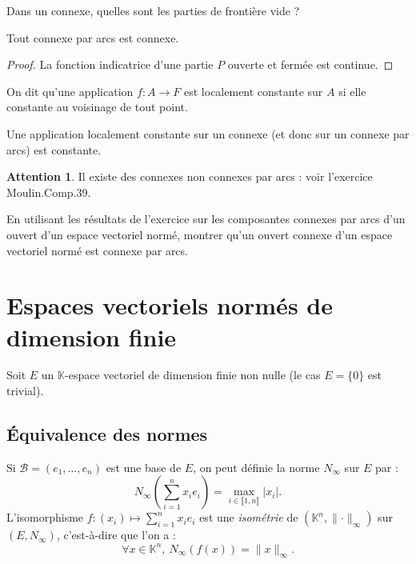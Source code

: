 \documentclass[french]{article}
\newcommand{\K}{\mathbb{K}}
\theoremstyle{plain}
\theoremstyle{definition}
\newtheorem*{attention}{Attention}
\theoremstyle{remark}
\begin{document}
\begin{exo}
	Dans un connexe, quelles sont les parties de frontière vide ?
\end{exo}

\begin{prop}%
	Tout connexe par arcs est connexe.
\end{prop}
\begin{proof}
	La fonction indicatrice d'une partie $P$ ouverte et fermée est continue.
\end{proof}

\begin{dfn}
	On dit qu'une application $f:A\to F$ est localement constante sur $A$ si elle constante au voisinage de tout point.
\end{dfn}

\begin{cor}%
	Une application localement constante sur un connexe (et donc sur un connexe par arcs) est constante.
\end{cor}

\begin{attention}
	Il existe des connexes non connexes par arcs : voir l'exercice Moulin.Comp.39.
\end{attention}

\begin{exo}
	En utilisant les résultats de l'exercice sur les composantes connexes par arcs d'un ouvert d'un espace vectoriel normé, montrer qu'un ouvert connexe d'un espace vectoriel normé est connexe par arcs.
\end{exo}

\section{Espaces vectoriels normés de dimension finie}

Soit $E$ un $\K$-espace vectoriel de dimension finie non nulle (le cas $E=\{0\}$ est trivial).

\subsection{Équivalence des normes}

Si $\mathcal{B}=(e_1,\ldots,e_n)$ est une base de $E$, on peut définie la norme $N_\infty$ sur $E$ par : $$N_\infty\left(\displaystyle\sum_{i=1}^{n}x_ie_i\right)=\underset{i\in\llbracket1,n\rrbracket}{\max}\lvert x_i\rvert.$$
L'isomorphisme $f:(x_i)\mapsto\displaystyle\sum_{i=1}^{n}x_ie_i$ est une \textit{isométrie} de $(\K^n,\lVert\cdot\rVert_\infty)$ sur $(E,N_\infty)$, c'est-à-dire que l'on a : 
$$\forall x\in\K^n,\ N_\infty(f(x))=\lVert x\rVert_\infty.$$
\end{document}

